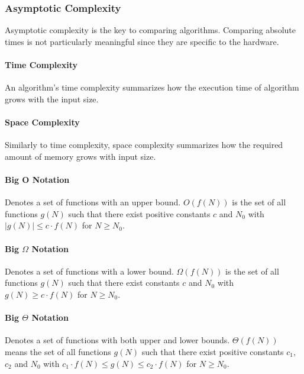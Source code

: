 \subsubsection{Asymptotic Complexity}
Asymptotic complexity is the key to comparing algorithms.
Comparing absolute times is not particularly meaningful since they are specific to the hardware.

\paragraph{Time Complexity}
An algorithm's time complexity summarizes how the execution time of algorithm grows with the input size.

\paragraph{Space Complexity}
Similarly to time complexity, space complexity summarizes how the required amount of memory grows with input size.

\paragraph{Big O Notation}
Denotes a set of functions with an upper bound.
$O(f(N))$ is the set of all functions $g(N)$ such that there exist positive constants $c$ and $N_0$ with $|g(N)| \le c \cdot f(N)$ for $N \ge N_0$.

\paragraph{Big $\Omega$ Notation}
Denotes a set of functions with a lower bound.
$\Omega(f(N))$ is the set of all functions $g(N)$ such that there exist constants $c$ and $N_0$ with $g(N) \ge c \cdot f(N)$ for $N \ge N_0$.

\paragraph{Big $\Theta$ Notation}
Denotes a set of functions with both upper and lower bounds.
$\Theta(f(N))$ means the set of all functions $g(N)$ such that there exist positive constants $c_1$, $c_2$ and $N_0$ with
$c_1 \cdot f(N) \le g(N) \le c_2 \cdot f(N)$ for $N \ge N_0$.